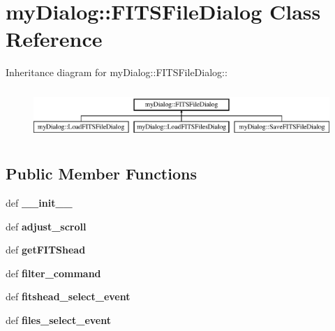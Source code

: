 \section{my\-Dialog::FITSFile\-Dialog Class Reference}
\label{classmyDialog_1_1FITSFileDialog}
Inheritance diagram for my\-Dialog::FITSFile\-Dialog::\begin{figure}[H]
\begin{center}
\leavevmode
\includegraphics[height=1.91453cm]{classmyDialog_1_1FITSFileDialog}
\end{center}
\end{figure}
\subsection*{Public Member Functions}
\begin{CompactItemize}
\item 
def \textbf{\_\-\_\-init\_\-\_\-}\label{classmyDialog_1_1FITSFileDialog_4daf47f45eef6d34d5136011c6b1f48a}

\item 
def \textbf{adjust\_\-scroll}\label{classmyDialog_1_1FITSFileDialog_f7b7e39e7ce102d103038e849f3d961e}

\item 
def \textbf{get\-FITShead}\label{classmyDialog_1_1FITSFileDialog_0cadb1b11beb98b9f1388c62fac293da}

\item 
def \textbf{filter\_\-command}\label{classmyDialog_1_1FITSFileDialog_a1795b4bd53b5b20d9d1aeec6315ecaa}

\item 
def \textbf{fitshead\_\-select\_\-event}\label{classmyDialog_1_1FITSFileDialog_5de71d9ff7dcab03a278ba11be160612}

\item 
def \textbf{files\_\-select\_\-event}\label{classmyDialog_1_1FITSFileDialog_32777b63bdaaf892cb0a1a47eba21c85}

\end{CompactItemize}
